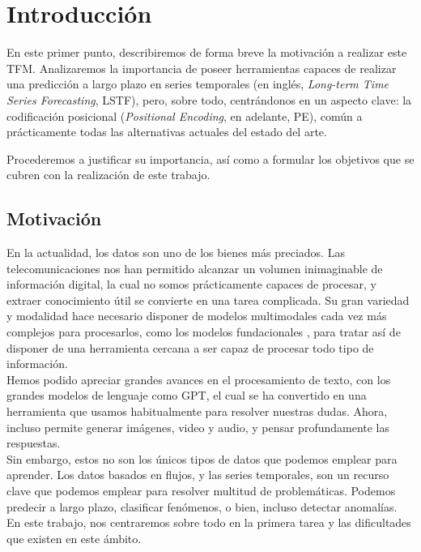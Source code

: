 \chapter{Introducción}

En este primer punto, describiremos de forma breve la motivación a realizar este TFM. Analizaremos la importancia de poseer herramientas capaces de realizar una predicción a largo plazo en series temporales (en inglés,\textit{ Long-term Time Series Forecasting},  LSTF), pero, sobre todo, centrándonos en un aspecto clave: la codificación posicional (\textit{Positional Encoding}, en adelante, PE), común a prácticamente todas las alternativas actuales del estado del arte. 

Procederemos a justificar su importancia, así como a formular los objetivos que se cubren con la realización de este trabajo.
\section{Motivación}

En la actualidad, los datos son uno de los bienes más preciados. Las telecomunicaciones nos han permitido alcanzar un volumen inimaginable de información digital, la cual no somos prácticamente capaces de procesar, y extraer conocimiento útil se convierte en una tarea complicada. Su gran variedad y modalidad hace necesario disponer de modelos multimodales cada vez más complejos para procesarlos, como los modelos fundacionales \cite{bommasani2022opportunitiesrisksfoundationmodels}, para tratar así de disponer de una herramienta cercana a ser capaz de procesar todo tipo de información.\\

Hemos podido apreciar grandes avances en el procesamiento de texto, con los grandes modelos de lenguaje como GPT, el cual se ha convertido en una herramienta que usamos habitualmente para resolver nuestras dudas. Ahora, incluso permite generar imágenes, video y audio, y pensar profundamente las respuestas.\\

Sin embargo, estos no son los únicos tipos de datos que podemos emplear para aprender. Los datos basados en flujos, y las series temporales, son un recurso clave que podemos emplear para resolver multitud de problemáticas. Podemos predecir a largo plazo, clasificar fenómenos, o bien, incluso detectar anomalías. En este trabajo, nos centraremos sobre todo en la primera tarea y las dificultades que existen en este ámbito.

